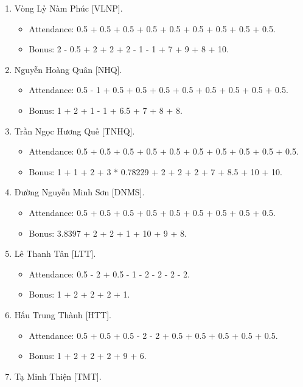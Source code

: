 \documentclass{article}
\begin{document}
\begin{enumerate}
\begin{itemize}
    \end{itemize}
    \item {\sc Vòng Lỷ Nàm Phúc [VLNP].}
    \begin{itemize}
        \item Attendance: 0.5 + 0.5 + 0.5 + 0.5 + 0.5 + 0.5 + 0.5 + 0.5 + 0.5.
        \item Bonus: 2 - 0.5 + 2 + 2 + 2 - 1 - 1 + 7 + 9 + 8 + 10.
    \end{itemize}
    \item {\sc Nguyễn Hoàng Quân [NHQ].}
    \begin{itemize}
        \item Attendance: 0.5 - 1 + 0.5 + 0.5 + 0.5 + 0.5 + 0.5 + 0.5 + 0.5 + 0.5.
        \item Bonus: 1 + 2 + 1 - 1 + 6.5 + 7 + 8 + 8.
    \end{itemize}
    \item {\sc Trần Ngọc Hương Quế [TNHQ].}
    \begin{itemize}
        \item Attendance: 0.5 + 0.5 + 0.5 + 0.5 + 0.5 + 0.5 + 0.5 + 0.5 + 0.5 + 0.5.
        \item Bonus: 1 + 1 + 2 + 3 * 0.78229 + 2 + 2 + 2 + 7 + 8.5 + 10 + 10.
    \end{itemize}
    \item {\sc Đường Nguyễn Minh Sơn [DNMS].}
    \begin{itemize}
        \item Attendance: 0.5 + 0.5 + 0.5 + 0.5 + 0.5 + 0.5 + 0.5 + 0.5 + 0.5.
        \item Bonus: 3.8397 + 2 + 2 + 1 + 10 + 9 + 8.
    \end{itemize}
    \item {\sc Lê Thanh Tân [LTT].}
    \begin{itemize}
        \item Attendance: 0.5 - 2 + 0.5 - 1 - 2 - 2 - 2 - 2.
        \item Bonus: 1 + 2 + 2 + 2 + 1.
    \end{itemize}
    \item {\sc Hấu Trung Thành [HTT].}
    \begin{itemize}
        \item Attendance: 0.5 + 0.5 + 0.5 - 2 - 2 + 0.5 + 0.5 + 0.5 + 0.5 + 0.5.
        \item Bonus: 1 + 2 + 2 + 2 + 9 + 6.
    \end{itemize}
    \item {\sc Tạ Minh Thiện [TMT].}

\end{enumerate}
\end{document}
